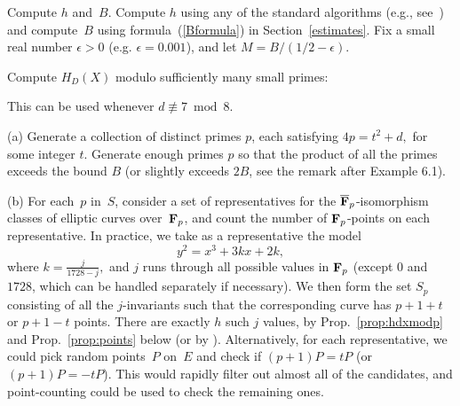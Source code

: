 \documentclass{amsart}
\newcommand{\Q}{{\bf{Q}}}
\newcommand{\F}{{\bf{F}}}
\newcommand{\noi}{\noindent}
\newcommand{\bigo}{{\rm O}}
\theoremstyle{plain}
\begin{document}
\vspace{0.1in}
\noi {\bf Step~(0)} Compute $h$ and~$B$.
Compute $h$ using any of the standard algorithms
(e.g., see~\cite[\S5.4]{cohen})
and compute~$B$ using formula~(\ref{Bformula}) in Section~\ref{estimates}.
Fix a small real number $\epsilon > 0$ (e.g. $\epsilon = 0.001$),
and let $M = B / (1/2-\epsilon)$.
\vspace{0.1in}

\noi {\bf Step~(1)} Compute $H_D(X)$ modulo sufficiently many small primes:

\vspace{0.1in}

\noi {\bf Version~A:} This can be used whenever $d \not \equiv 7 \bmod 8$. 

\vspace{0.1in}

\noi (a)
Generate a collection of distinct primes $p$, each satisfying
$4p = t^2 + d,$  for some integer $t$.
Generate enough primes $p$
so that the product of all the primes exceeds the bound $B$
(or slightly exceeds $2B$, see the remark after Example 6.1).



\noi (b) 
For each~$p$ in~$S$, consider a set of representatives for the
$\overline{\F}_p$-isomorphism classes of elliptic curves over~$\F_p$, and
count the number of $\F_p$-points on each representative.  
In practice, we take as a representative the model $$y^2=x^3+3kx+2k,$$
where $k=\frac{j}{1728-j},$ and $j$ runs through all possible values in
$\F_p$ (except $0$ and $1728$, which can be handled separately if necessary).
We then form the set $S_p$ consisting of all the $j$-invariants
such that the corresponding curve has $p+1+t$ or $p+1-t$ points.    
There are exactly $h$ such $j$ values, by
Prop.~\ref{prop:hdxmodp} and Prop.~\ref{prop:points} below
(or by \cite[p. 319]{cox}).  Alternatively, for each representative, 
we could pick random points~$P$ on~$E$
and check if $(p+1)P = t P$ (or $(p+1)P = - t P$). This would rapidly
filter out almost all of the candidates, and point-counting could be
used to check the remaining ones. 
\end{document}
